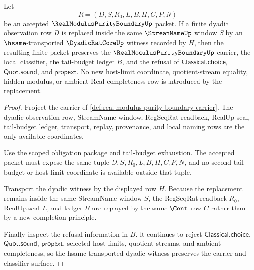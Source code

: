 \begin{theorem}
\label{thm:real-modulus-purity-boundary-dyadic-witness-stability}
Let
$$
R=(D,S,R_0,L,B,H,C,P,N)
$$
be an accepted $\RealModulusPurityBoundaryUp$ packet. If a finite dyadic observation row $D$ is replaced inside the same $\StreamNameUp$ window $S$ by an $\hsame$-transported $\DyadicRatCoreUp$ witness recorded by $H$, then the resulting finite packet preserves the $\RealModulusPurityBoundaryUp$ carrier, the local classifier, the tail-budget ledger $B$, and the refusal of $\mathsf{Classical.choice}$, $\mathsf{Quot.sound}$, and $\mathsf{propext}$. No new host-limit coordinate, quotient-stream equality, hidden modulus, or ambient Real-completeness row is introduced by the replacement.
\end{theorem}
\begin{proof}
Project the carrier of \autoref{def:real-modulus-purity-boundary-carrier}. The dyadic observation row, StreamName window, RegSeqRat readback, RealUp seal, tail-budget ledger, transport, replay, provenance, and local naming rows are the only available coordinates.

Use the scoped obligation package and tail-budget exhaustion. The accepted packet must expose the same tuple $D,S,R_0,L,B,H,C,P,N$, and no second tail-budget or host-limit coordinate is available outside that tuple.

Transport the dyadic witness by the displayed row $H$. Because the replacement remains inside the same StreamName window $S$, the RegSeqRat readback $R_0$, RealUp seal $L$, and ledger $B$ are replayed by the same $\Cont$ row $C$ rather than by a new completion principle.

Finally inspect the refusal information in $B$. It continues to reject $\mathsf{Classical.choice}$, $\mathsf{Quot.sound}$, $\mathsf{propext}$, selected host limits, quotient streams, and ambient completeness, so the hsame-transported dyadic witness preserves the carrier and classifier surface.
\end{proof}

